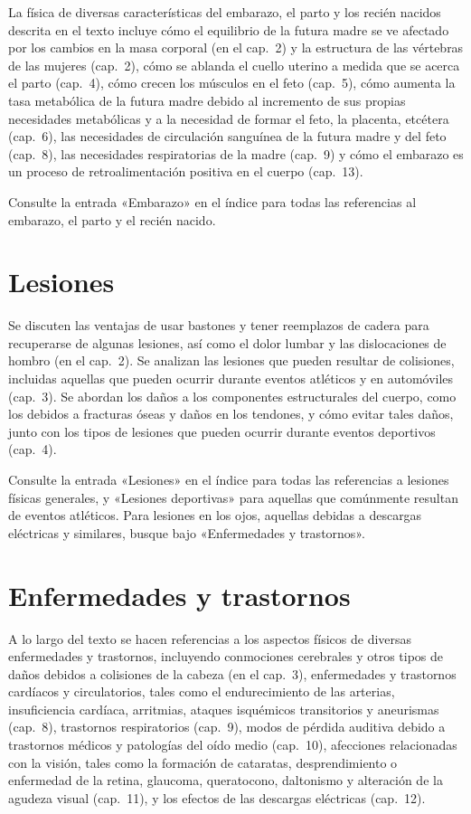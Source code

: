 \documentclass[12pt,a4paper]{book}
\begin{document}
La física de diversas características del embarazo, el parto y los recién nacidos descrita en el texto incluye cómo el equilibrio de la futura madre se ve afectado por los cambios en la masa corporal (en el cap.~2) y la estructura de las vértebras de las mujeres (cap.~2), cómo se ablanda el cuello uterino a medida que se acerca el parto (cap.~4), cómo crecen los músculos en el feto (cap.~5), cómo aumenta la tasa metabólica de la futura madre debido al incremento de sus propias necesidades metabólicas y a la necesidad de formar el feto, la placenta, etcétera (cap.~6), las necesidades de circulación sanguínea de la futura madre y del feto (cap.~8), las necesidades respiratorias de la madre (cap.~9) y cómo el embarazo es un proceso de retroalimentación positiva en el cuerpo (cap.~13).

Consulte la entrada «Embarazo» en el índice para todas las referencias al embarazo, el parto y el recién nacido.

\section{Lesiones}
\label{sec:f2}

Se discuten las ventajas de usar bastones y tener reemplazos de cadera para recuperarse de algunas lesiones, así como el dolor lumbar y las dislocaciones de hombro (en el cap.~2). Se analizan las lesiones que pueden resultar de colisiones, incluidas aquellas que pueden ocurrir durante eventos atléticos y en automóviles (cap.~3). Se abordan los daños a los componentes estructurales del cuerpo, como los debidos a fracturas óseas y daños en los tendones, y cómo evitar tales daños, junto con los tipos de lesiones que pueden ocurrir durante eventos deportivos (cap.~4).

Consulte la entrada «Lesiones» en el índice para todas las referencias a lesiones físicas generales, y «Lesiones deportivas» para aquellas que comúnmente resultan de eventos atléticos. Para lesiones en los ojos, aquellas debidas a descargas eléctricas y similares, busque bajo «Enfermedades y trastornos».

\section{Enfermedades y trastornos}
\label{sec:f3}

A lo largo del texto se hacen referencias a los aspectos físicos de diversas enfermedades y trastornos, incluyendo conmociones cerebrales y otros tipos de daños debidos a colisiones de la cabeza (en el cap.~3), enfermedades y trastornos cardíacos y circulatorios, tales como el endurecimiento de las arterias, insuficiencia cardíaca, arritmias, ataques isquémicos transitorios y aneurismas (cap.~8), trastornos respiratorios (cap.~9), modos de pérdida auditiva debido a trastornos médicos y patologías del oído medio (cap.~10), afecciones relacionadas con la visión, tales como la formación de cataratas, desprendimiento o enfermedad de la retina, glaucoma, queratocono, daltonismo y alteración de la agudeza visual (cap.~11), y los efectos de las descargas eléctricas (cap.~12).
\end{document}
